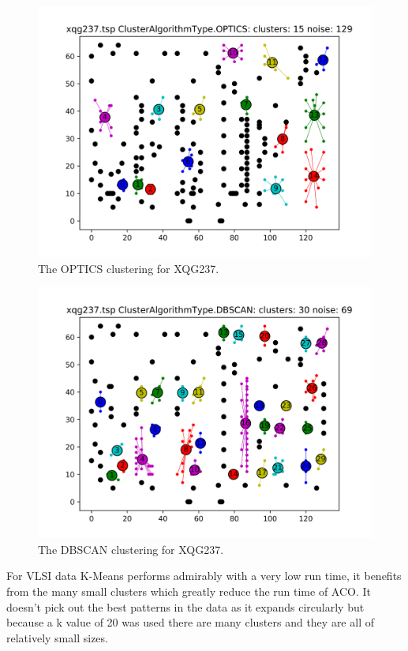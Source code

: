 \begin{figure}
    \centering
    \includegraphics[width=\textwidth]{figures/xqg237_OPTICS.png}
    \caption{The OPTICS clustering for XQG237.}
    \label{fig:xqg237_optics}
\end{figure}

\begin{figure}
    \centering
    \includegraphics[width=\textwidth]{figures/xqg237_DBSCAN.png}
    \caption{The DBSCAN clustering for XQG237.}
    \label{fig:xqg237_dbscan}
\end{figure}

For VLSI data K-Means performs admirably with a very low run time, it benefits from the many small clusters which greatly reduce the run time of ACO. It doesn't pick out the best patterns in the data as it expands circularly but because a k value of 20 was used there are many clusters and they are all of relatively small sizes.

